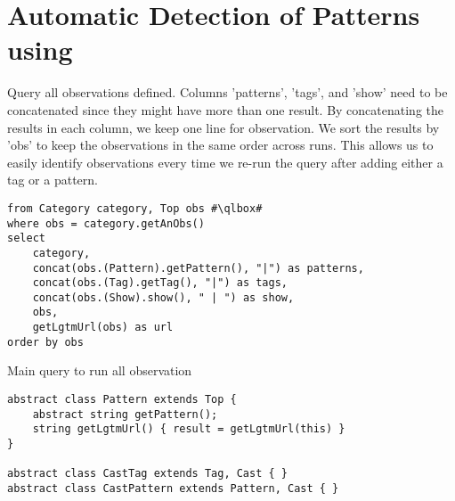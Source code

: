 \chapter{Automatic Detection of Patterns using \ql{}}\label{ap:ql}

Query all observations defined.
Columns 'patterns', 'tags', and 'show' need to be concatenated since they might have more than one result.
By concatenating the results in each column, we keep one line for observation.
We sort the results by 'obs' to keep the observations in the same order across runs.
This allows us to easily identify observations every time we re-run the query after adding either a tag or a pattern.

\begin{listing}
\begin{verbatim}
from Category category, Top obs #\qlbox#
where obs = category.getAnObs()
select
	category,
	concat(obs.(Pattern).getPattern(), "|") as patterns,
	concat(obs.(Tag).getTag(), "|") as tags,
	concat(obs.(Show).show(), " | ") as show,
	obs,
	getLgtmUrl(obs) as url
order by obs
\end{verbatim}
\caption{Main query to run all observation}
\end{listing}

\begin{listing}
\begin{verbatim}
abstract class Pattern extends Top {
	abstract string getPattern();
	string getLgtmUrl() { result = getLgtmUrl(this) }
}

abstract class CastTag extends Tag, Cast { }
abstract class CastPattern extends Pattern, Cast { }
\end{verbatim}
\end{listing}